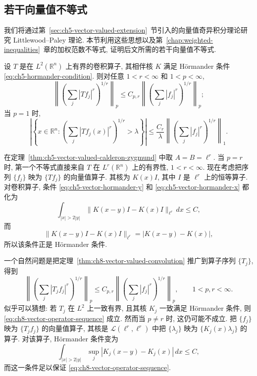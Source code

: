 \hypertarget{chapter-08-page-169}{}
\subsection{若干向量值不等式}
\label{sec:ch8-vector-valued-inequalities}

我们将通过第~\ref{sec:ch5-vector-valued-extension}~节引入的向量值奇异积分理论研究 Littlewood--Paley 理论. 本节利用这些思想以及第~\ref{chap:weighted-inequalities}~章的加权范数不等式, 证明后文所需的若干向量值不等式.

\begin{Theorem}
\label{thm:ch8-vector-valued-convolution}
设 $T$ 是在 $L^2(\mathbb R^n)$ 上有界的卷积算子, 其相伴核 $K$ 满足 Hörmander 条件 \eqref{eq:ch5-hormander-condition}. 则对任意 $1<r<\infty$ 和 $1<p<\infty$,
\[
 \left\|\left(\sum_j|Tf_j|^r\right)^{1/r}\right\|_p
 \le C_{p,r}\left\|\left(\sum_j|f_j|^r\right)^{1/r}\right\|_p;
\]
当 $p=1$ 时,
\[
 \left|\left\{x\in\mathbb R^n:
 \left(\sum_j|Tf_j(x)|^r\right)^{1/r}>\lambda\right\}\right|
 \le\frac{C_r}{\lambda}
 \left\|\left(\sum_j|f_j|^r\right)^{1/r}\right\|_1.
\]
\end{Theorem}

\begin{Proof}
在定理~\ref{thm:ch5-vector-valued-calderon-zygmund} 中取 $A=B=\ell^r$. 当 $p=r$ 时, 第一个不等式直接来自 $T$ 在 $L^r(\mathbb R^n)$ 上的有界性, $1<r<\infty$. 现在考虑把序列 $\{f_j\}$ 映为 $\{Tf_j\}$ 的向量值算子. 其核为 $K(x)I$, 其中 $I$ 是 $\ell^r$ 上的恒等算子. 对卷积算子, 条件 \eqref{eq:ch5-vector-hormander-y} 和 \eqref{eq:ch5-vector-hormander-x} 都化为
\[
 \int_{|x|>2|y|}\|K(x-y)I-K(x)I\|_{\ell^r}\,dx\le C,
\]
而
\[
 \|K(x-y)I-K(x)I\|_{\ell^r}=|K(x-y)-K(x)|,
\]
所以该条件正是 Hörmander 条件.
\end{Proof}

\hypertarget{chapter-08-page-170}{}
一个自然问题是把定理~\ref{thm:ch8-vector-valued-convolution} 推广到算子序列 $\{T_j\}$, 得到
\begin{equation}
\label{eq:ch8-vector-operator-sequence}
 \left\|\left(\sum_j|T_jf_j|^r\right)^{1/r}\right\|_p
 \le C_{p,r}\left\|\left(\sum_j|f_j|^r\right)^{1/r}\right\|_p,
 \qquad1<p,r<\infty.
\end{equation}
似乎可以猜想: 若 $T_j$ 在 $L^2$ 上一致有界, 且其核 $K_j$ 一致满足 Hörmander 条件, 则 \eqref{eq:ch8-vector-operator-sequence} 成立. 然而当 $p\ne r$ 时, 这仍可能不成立. 把 $\{f_j\}$ 映为 $\{T_jf_j\}$ 的向量值算子, 其核是 $\mathcal L(\ell^r,\ell^r)$ 中把 $\{\lambda_j\}$ 映为 $\{K_j(x)\lambda_j\}$ 的算子. 对该算子, Hörmander 条件变为
\[
 \int_{|x|>2|y|}\sup_j|K_j(x-y)-K_j(x)|\,dx\le C,
\]
而这一条件足以保证 \eqref{eq:ch8-vector-operator-sequence}.

